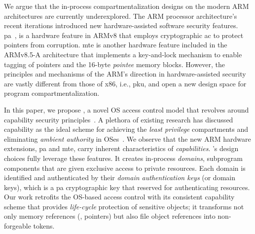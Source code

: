 We argue that the in-process compartmentalization designs on the modern ARM architectures are currently underexplored.
The ARM processor architecture's recent iterations introduced new hardware-assisted software security features.
\Gls{pa}~\cite{arm-arch,armv8-m}, is a hardware feature in ARMv8 that employs cryptographic \gls{ac} to protect pointers from corruption.
\gls{mte} is another hardware feature included in the ARMv8.5-A architecture that implements a key-and-lock mechanism
to enable tagging of pointers and the 16-byte \emph{pointee} memory blocks.
However, the principles and mechanisms of the ARM's direction in hardware-assisted security are vastly different from those of x86, i.e., \gls{pku}, and open a new design space for program compartmentalization.


In this paper, we propose \thename, a novel OS access control model that revolves around capability security principles~\cite{obj-cap,eros}.
A plethora of existing research has discussed capability as the ideal scheme for achieving the \emph{least privilege} compartments and eliminating \emph{ambient authority} in OSes~\cite{cheri,watson2010capsicum,eros,cheri-risc,cheriabi}.
We observe that the new ARM hardware extensions, \gls{pa} and \gls{mte}, carry inherent characteristics of \emph{capabilities}.
\thename's design choices fully leverage these features.
It creates in-process \emph{domains}, subprogram components that are given exclusive access to private resources.
Each domain is identified and authenticated by their \emph{domain authentication keys} (or domain keys), which is a \gls{pa} cryptographic key that \thename reserved for authenticating resources.
Our work retrofits the OS-based access control with its consistent capability scheme that provides \emph{life-cycle} protection of sensitive objects; it transforms not only memory references (\ie, pointers) but also file object references into non-forgeable tokens.


